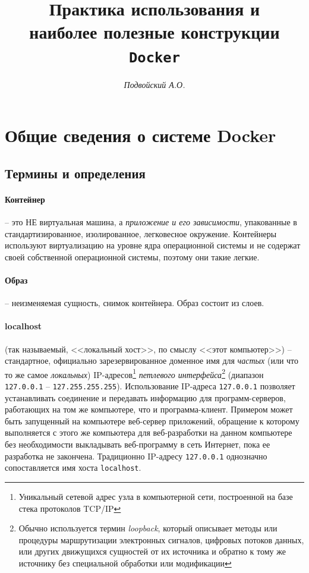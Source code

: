 \documentclass[%
	11pt,
	a4paper,
	utf8,
		]{article}
\begin{document}
\title{Практика использования и \\наиболее полезные конструкции \texttt{Docker}}

\author{\itshape Подвойский А.О.}

\date{}
\maketitle

\thispagestyle{fancy}

\tableofcontents

\section{Общие сведения о системе Docker}

\subsection{Термины и определения}

\paragraph{Контейнер} -- это НЕ виртуальная машина, а \emph{приложение  и его зависимости}, упакованные в стандартизированное, изолированное, легковесное окружение. Контейнеры используют виртуализацию на уровне ядра операционной системы и не содержат своей собственной операционной системы, поэтому они такие легкие.

\paragraph{Образ} -- неизменяемая сущность, снимок контейнера. Образ состоит из слоев.

\paragraph{{localhost}} (так называемый, <<локальный хост>>, по смыслу <<этот компьютер>>) -- стандартное, официально зарезервированное доменное имя для \emph{частых} (или что то же самое \emph{локальных}) IP-адресов\footnote{Уникальный сетевой адрес узла в компьютерной сети, построенной на базе стека протоколов TCP/IP} \emph{петлевого интерфейса}\footnote{Обычно используется термин \emph{loopback}, который описывает методы или процедуры маршрутизации электронных сигналов, цифровых потоков данных, или других движущихся сущностей от их источника и обратно к тому же источнику без специальной обработки или модификации} (диапазон \texttt{127.0.0.1} -- \texttt{127.255.255.255}). Использование IP-адреса \texttt{127.0.0.1} позволяет устанавливать соединение и передавать информацию для программ-серверов, работающих на том же компьютере, что и программа-клиент. Примером может быть запущенный на компьютере веб-сервер приложений, обращение к которому выполняется с этого же компьютера для веб-разработки на данном компьютере без необходимости выкладывать веб-программу в сеть Интернет, пока ее разработка не закончена. Традиционно IP-адресу \texttt{127.0.0.1} однозначно сопоставляется имя хоста \texttt{localhost}.
\end{document}
